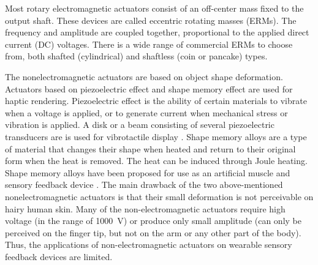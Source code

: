 Most rotary electromagnetic actuators consist of an off-center mass fixed to the output shaft.  These devices are called eccentric rotating masses (ERMs). The frequency and amplitude are coupled together, proportional to the applied direct current (DC) voltages. There is a wide range of commercial ERMs to choose from, both shafted (cylindrical) and shaftless (coin or pancake) types.

The nonelectromagnetic actuators are based on object shape deformation. 
Actuators based on piezoelectric effect and shape memory effect are used for haptic rendering. Piezoelectric effect is the ability of certain materials to vibrate when a voltage is applied, or to generate current when mechanical stress or vibration is applied.  A disk or a beam consisting of several piezoelectric transducers are is used for vibrotactile display \cite{poupyrev2002ambient}. 
Shape memory alloys are a type of material that changes their shape when heated and return to their original form when the heat is removed. The heat can be induced through Joule heating. Shape memory alloys have been proposed for use as an artificial muscle \cite{taniguchi2013flexible} and sensory feedback device \cite{sawada2016tactile}. The main drawback of the two above-mentioned nonelectromagnetic actuators is that their small deformation is not perceivable on hairy human skin. Many of the non-electromagnetic actuators require high voltage (in the range of \SI{1000}{V}) or produce only small amplitude (can only be perceived on the finger tip, but not on the arm or any other part of the body). Thus, the applications of non-electromagnetic actuators on wearable sensory feedback devices are limited.


